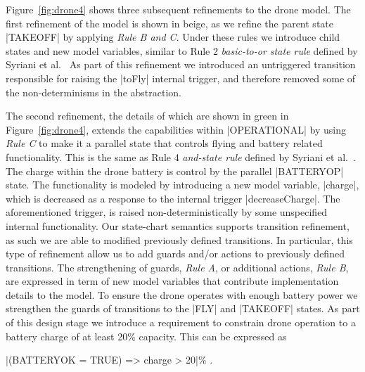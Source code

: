 Figure~\ref{fig:drone4} shows three subsequent refinements to the drone model. The first refinement of the model is shown in beige, as we refine the parent state |TAKEOFF|
by applying \emph{Rule B and C}. Under these rules we introduce child states and new model variables, similar to 
Rule 2 \emph{basic-to-or state rule} defined by Syriani et al.~\cite{Syriani_2019}
As part of this refinement we introduced an untriggered transition responsible for 
raising the |toFly| internal trigger, and therefore removed some of the non-determinisms in the abstraction.

The second refinement, the details of which are shown in green in Figure~\ref{fig:drone4}, 
extends the capabilities within |OPERATIONAL| by using \emph{Rule C} to make it a parallel
state that controls flying and battery related functionality. 
This is the same as Rule 4 \emph{and-state rule} defined by Syriani et al.~\cite{Syriani_2019}.
The charge within the drone battery is control by the parallel |BATTERYOP| state. 
The functionality is modeled by introducing a new model variable, |charge|, which is decreased as 
a response to the internal trigger |decreaseCharge|. The aforementioned trigger, is raised non-deterministically by some 
unspecified internal functionality. Our state-chart semantics supports transition refinement, as such
we are able to modified previously defined transitions. In particular, this type of refinement allow
us to add guards and/or actions to previously defined transitions. The strengthening of guards, \emph{Rule A}, or additional 
actions, \emph{Rule B}, are expressed in term of new model variables that contribute implementation details to the model.
To ensure the drone operates with enough battery power we strengthen the guards of transitions 
to the |FLY| and |TAKEOFF| states.
As part of this design stage we introduce a requirement to constrain drone operation 
to a battery charge of at least 20\% capacity. This can be expressed as
\begin{center}
  |(BATTERYOK = TRUE) => charge > 20|\% .
\end{center}

